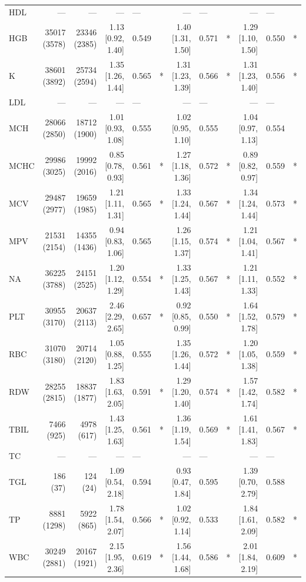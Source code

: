 \begin{table}[ht]
\begin{tabular}{lrrrlcrlcrlc}
HDL & --- & --- & --- & --- &  & --- & --- &  & --- & --- &  \\
HGB & 35017 (3578) & 23346 (2385) & 1.13 [0.92, 1.40] & 0.549 &  & 1.40 [1.31, 1.50] & 0.571 & * & 1.29 [1.10, 1.50] & 0.550 & * \\
K & 38601 (3892) & 25734 (2594) & 1.35 [1.26, 1.44] & 0.565 & * & 1.31 [1.23, 1.39] & 0.566 & * & 1.31 [1.23, 1.40] & 0.556 & * \\
LDL & --- & --- & --- & --- &  & --- & --- &  & --- & --- &  \\
MCH & 28066 (2850) & 18712 (1900) & 1.01 [0.93, 1.08] & 0.555 &  & 1.02 [0.95, 1.10] & 0.555 &  & 1.04 [0.97, 1.13] & 0.554 &  \\
MCHC & 29986 (3025) & 19992 (2016) & 0.85 [0.78, 0.93] & 0.561 & * & 1.27 [1.18, 1.36] & 0.572 & * & 0.89 [0.82, 0.97] & 0.559 & * \\
MCV & 29487 (2977) & 19659 (1985) & 1.21 [1.11, 1.31] & 0.565 & * & 1.33 [1.24, 1.44] & 0.567 & * & 1.34 [1.24, 1.44] & 0.573 & * \\
MPV & 21531 (2154) & 14355 (1436) & 0.94 [0.83, 1.06] & 0.565 &  & 1.26 [1.15, 1.37] & 0.574 & * & 1.21 [1.04, 1.41] & 0.567 & * \\
NA & 36225 (3788) & 24151 (2525) & 1.20 [1.12, 1.29] & 0.554 & * & 1.33 [1.25, 1.43] & 0.567 & * & 1.21 [1.11, 1.33] & 0.552 & * \\
PLT & 30955 (3170) & 20637 (2113) & 2.46 [2.29, 2.65] & 0.657 & * & 0.92 [0.85, 0.99] & 0.550 & * & 1.64 [1.52, 1.78] & 0.579 & * \\
RBC & 31070 (3180) & 20714 (2120) & 1.05 [0.88, 1.25] & 0.555 &  & 1.35 [1.26, 1.44] & 0.572 & * & 1.20 [1.05, 1.38] & 0.559 & * \\
RDW & 28255 (2815) & 18837 (1877) & 1.83 [1.63, 2.05] & 0.591 & * & 1.29 [1.20, 1.40] & 0.574 & * & 1.57 [1.42, 1.74] & 0.582 & * \\
TBIL & 7466 (925) & 4978 (617) & 1.43 [1.25, 1.63] & 0.561 & * & 1.36 [1.19, 1.54] & 0.569 & * & 1.61 [1.41, 1.83] & 0.567 & * \\
TC & --- & --- & --- & --- &  & --- & --- &  & --- & --- &  \\
TGL & 186 (37) & 124 (24) & 1.09 [0.54, 2.18] & 0.594 &  & 0.93 [0.47, 1.84] & 0.595 &  & 1.39 [0.70, 2.79] & 0.588 &  \\
TP & 8881 (1298) & 5922 (865) & 1.78 [1.54, 2.07] & 0.566 & * & 1.02 [0.92, 1.14] & 0.533 &  & 1.84 [1.61, 2.09] & 0.582 & * \\
WBC & 30249 (2881) & 20167 (1921) & 2.15 [1.95, 2.36] & 0.619 & * & 1.56 [1.44, 1.68] & 0.586 & * & 2.01 [1.84, 2.19] & 0.609 & * \\
\bottomrule
\end{tabular}
\end{table}
